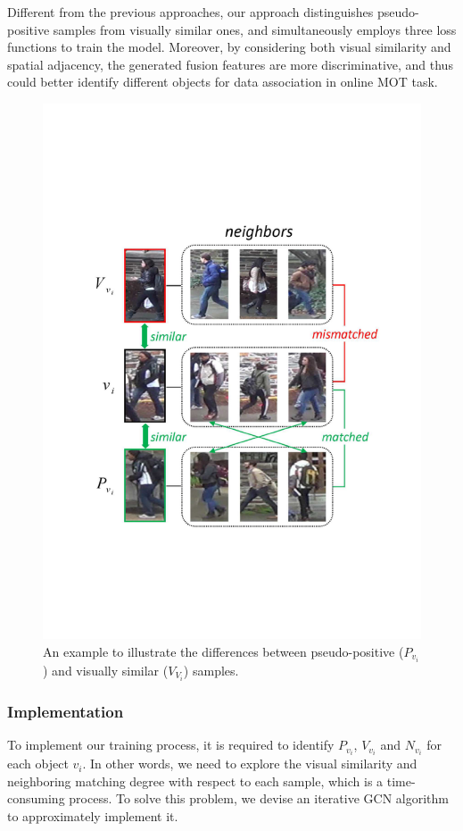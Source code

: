 \documentclass[10pt,twocolumn,letterpaper]{article}
\begin{document}
Different from the previous approaches, our approach distinguishes pseudo-positive samples from visually similar ones,
and simultaneously employs three loss functions to train the model.
Moreover, by considering both visual similarity and spatial adjacency, the generated fusion features are more discriminative, 
and thus could better identify different objects for data association in online MOT task.



\begin{figure}[ht]
	\centering
	\includegraphics[scale=0.4]{fig/sample_difference.pdf}
	\caption{An example to illustrate the differences between pseudo-positive ($P_{v_i}$) and visually similar ($V_{V_i}$) samples.}
	\label{fig:sample_difference}
\end{figure}

\subsubsection{Implementation}
To implement our training process, it is required to identify $P_{v_i}$, $V_{v_i}$ and $N_{v_i}$ for each object $v_i$.
In other words, we need to explore the visual similarity and neighboring matching degree with respect to each sample, which is a time-consuming process.
To solve this problem, we devise an iterative GCN algorithm to approximately implement it.
\end{document}
